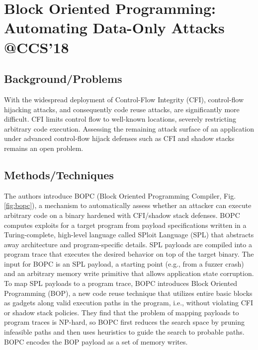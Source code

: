\section{Block Oriented Programming: Automating Data-Only Attacks @CCS'18}
\subsection{Background/Problems}
With the widespread deployment of Control-Flow Integrity (CFI), control-flow hijacking attacks, and consequently code reuse attacks, are significantly more difficult. CFI limits control flow to well-known locations, severely restricting arbitrary code execution.  Assessing the remaining attack surface of an application under advanced control-flow hijack defenses such as CFI and shadow stacks remains an open problem.
\subsection{Methods/Techniques}
The authors introduce BOPC (Block Oriented Programming Compiler, Fig.\ref{fig:bopc}), a mechanism to automatically assess whether an attacker can execute arbitrary code on a binary hardened with CFI/shadow stack defenses. BOPC computes exploits for a target program from payload specifications written in a Turing-complete, high-level language called SPloit Language (SPL) that abstracts away architecture and program-specific details. SPL payloads are compiled into a program trace that executes the desired behavior on top of the target binary.  The input for BOPC is an SPL payload, a starting point (e.g., from a fuzzer crash) and an arbitrary memory write primitive that allows application state corruption. To map SPL payloads to a program trace, BOPC introduces Block Oriented Programming (BOP), a new code reuse technique that utilizes entire basic blocks as gadgets along valid execution paths in the program, i.e., without violating CFI or shadow stack policies. They find that the problem of mapping payloads to program traces is NP-hard, so BOPC first reduces the search space by pruning infeasible paths and then uses heuristics to guide the search to probable paths. BOPC encodes the BOP payload as a set of memory writes.


